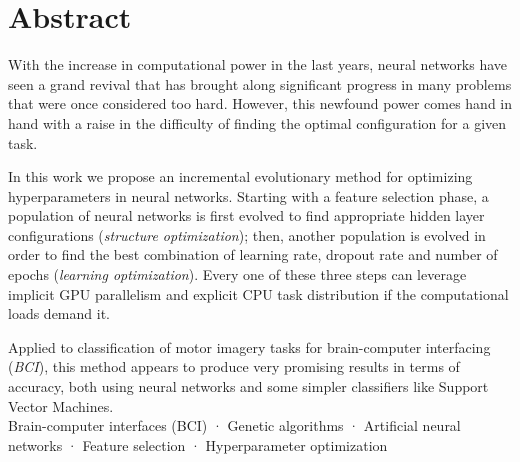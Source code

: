 \begingroup
\let\cleardoublepage\relax
\let\cleardoublepage\relax

\chapter*{Abstract}

With the increase in computational power in the last years, neural networks have seen a grand revival that has brought along significant progress in many problems that were once considered too hard. However, this newfound power comes hand in hand with a raise in the difficulty of finding the optimal configuration for a given task.

In this work we propose an incremental evolutionary method for optimizing hyperparameters in neural networks. Starting with a feature selection phase, a population of neural networks is first evolved to find appropriate hidden layer configurations (\textit{structure optimization}); then, another population is evolved in order to find the best combination of learning rate, dropout rate and number of epochs (\textit{learning optimization}). Every one of these three steps can leverage implicit GPU parallelism and explicit CPU task distribution if the computational loads demand it.

Applied to classification of motor imagery tasks for brain-computer interfacing (\textit{BCI}), this method appears to produce very promising results in terms of accuracy, both using neural networks and some simpler classifiers like Support Vector Machines.\\

\noindent{} Brain-computer interfaces (BCI) · Genetic algorithms · Artificial neural networks · Feature selection · Hyperparameter optimization


\vfill
